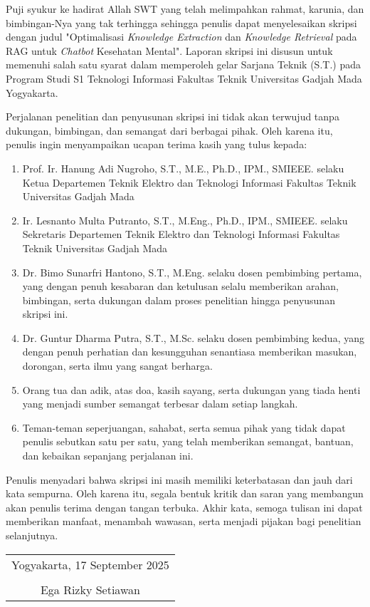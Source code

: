 Puji syukur ke hadirat Allah SWT yang telah melimpahkan rahmat, karunia, dan bimbingan-Nya yang tak terhingga sehingga penulis dapat menyelesaikan skripsi dengan judul "Optimalisasi\textit{ Knowledge Extraction} dan \textit{Knowledge Retrieval} pada RAG untuk \textit{Chatbot} Kesehatan Mental".
Laporan skripsi ini disusun untuk memenuhi salah satu syarat dalam memperoleh gelar Sarjana Teknik (S.T.) pada Program Studi S1 Teknologi Informasi Fakultas Teknik Universitas Gadjah Mada Yogyakarta.


Perjalanan penelitian dan penyusunan skripsi ini tidak akan terwujud tanpa dukungan, bimbingan, dan semangat dari berbagai pihak. Oleh karena itu, penulis ingin menyampaikan ucapan terima kasih yang tulus kepada:

\begin{enumerate}
	\item Prof. Ir. Hanung Adi Nugroho, S.T., M.E., Ph.D., IPM., SMIEEE. selaku Ketua Departemen Teknik Elektro dan Teknologi Informasi Fakultas Teknik Universitas Gadjah Mada

	\item  Ir. Lesnanto Multa Putranto, S.T., M.Eng., Ph.D., IPM., SMIEEE. selaku Sekretaris Departemen Teknik Elektro dan Teknologi Informasi Fakultas Teknik Universitas Gadjah Mada

	\item Dr. Bimo Sunarfri Hantono, S.T., M.Eng. selaku dosen pembimbing pertama, yang dengan penuh kesabaran dan ketulusan selalu memberikan arahan, bimbingan, serta dukungan dalam proses penelitian hingga penyusunan skripsi ini.

	\item Dr. Guntur Dharma Putra, S.T., M.Sc. selaku dosen pembimbing kedua, yang dengan penuh perhatian dan kesungguhan senantiasa memberikan masukan, dorongan, serta ilmu yang sangat berharga.

	\item Orang tua dan adik, atas doa, kasih sayang, serta dukungan yang tiada henti yang menjadi sumber semangat terbesar dalam setiap langkah.

	\item Teman-teman seperjuangan, sahabat, serta semua pihak yang tidak dapat penulis sebutkan satu per satu, yang telah memberikan semangat, bantuan, dan kebaikan sepanjang perjalanan ini.


\end{enumerate}

Penulis menyadari bahwa skripsi ini masih memiliki keterbatasan dan jauh dari kata sempurna. Oleh karena itu, segala bentuk kritik dan saran yang membangun akan penulis terima dengan tangan terbuka.
Akhir kata, semoga tulisan ini dapat memberikan manfaat, menambah wawasan, serta menjadi pijakan bagi penelitian selanjutnya.

\begin{flushright}
	\begin{tabular}{c}
		Yogyakarta, 17 September 2025 \\
		\vspace{1cm}                  \\
		Ega Rizky Setiawan
	\end{tabular}
\end{flushright}